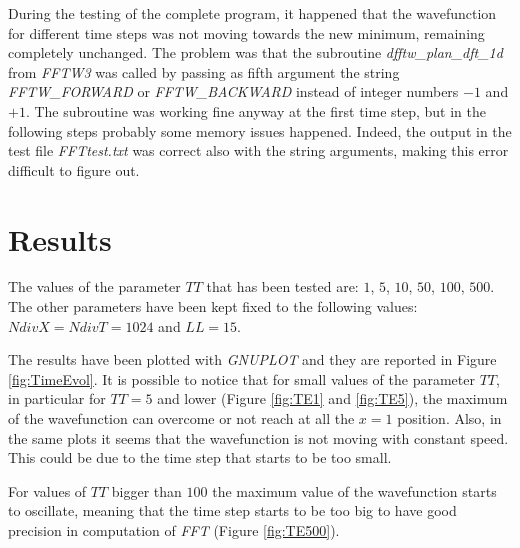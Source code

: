 \documentclass[11pt,a4paper]{article}
\begin{document}
During the testing of the complete program, it happened that the wavefunction for different time steps was not moving towards the new minimum, remaining completely unchanged. The problem was that the subroutine \textit{dfftw\_plan\_dft\_1d} from \textit{FFTW3} was called by passing as fifth argument the string \textit{FFTW\_FORWARD} or \textit{FFTW\_BACKWARD} instead of integer numbers $-1$ and $+1$. The subroutine was working fine anyway at the first time step, but in the following steps probably some memory issues happened. Indeed, the output in the test file \textit{FFTtest.txt} was correct also with the string arguments, making this error difficult to figure out.


%

\section{Results} %

The values of the parameter $TT$ that has been tested are: $1$, $5$, $10$, $50$, $100$, $500$.
The other parameters have been kept fixed to the following values: $NdivX = NdivT = 1024$ and $LL = 15$.

The results have been plotted with \textit{GNUPLOT} and they are reported in Figure \ref{fig:TimeEvol}.
It is possible to notice that for small values of the parameter $TT$, in particular for $TT=5$ and lower (Figure \ref{fig:TE1} and \ref{fig:TE5}), the maximum of the wavefunction can overcome or not reach at all the $x=1$ position. Also, in the same plots it seems that the wavefunction is not moving with constant speed. This could be due to the time step that starts to be too small.

For values of $TT$ bigger than $100$ the maximum value of the wavefunction starts to oscillate, meaning that the time step starts to be too big to have good precision in computation of \textit{FFT} (Figure \ref{fig:TE500}).
 
\end{document}
